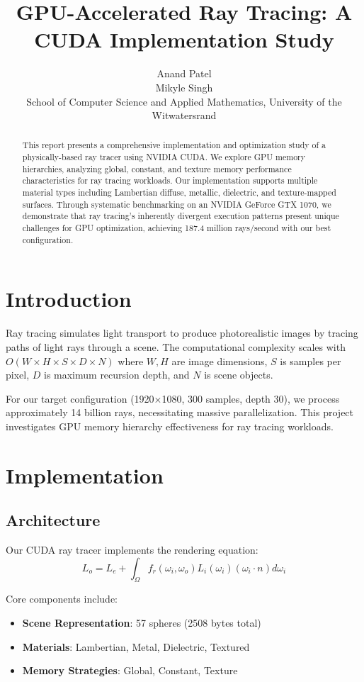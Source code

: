 \documentclass[conference]{IEEEtran}
\title{GPU-Accelerated Ray Tracing: A CUDA Implementation Study}
\author{Anand Patel \\Mikyle Singh \\ School of Computer Science and Applied Mathematics, University of the Witwatersrand}
\begin{document}
\maketitle

\begin{abstract}
This report presents a comprehensive implementation and optimization study of a physically-based ray tracer using NVIDIA CUDA. We explore GPU memory hierarchies, analyzing global, constant, and texture memory performance characteristics for ray tracing workloads. Our implementation supports multiple material types including Lambertian diffuse, metallic, dielectric, and texture-mapped surfaces. Through systematic benchmarking on an NVIDIA GeForce GTX 1070, we demonstrate that ray tracing's inherently divergent execution patterns present unique challenges for GPU optimization, achieving 187.4 million rays/second with our best configuration.
\end{abstract}

\section{Introduction}
Ray tracing simulates light transport to produce photorealistic images by tracing paths of light rays through a scene. The computational complexity scales with $O(W \times H \times S \times D \times N)$ where $W,H$ are image dimensions, $S$ is samples per pixel, $D$ is maximum recursion depth, and $N$ is scene objects.

For our target configuration (1920×1080, 300 samples, depth 30), we process approximately 14 billion rays, necessitating massive parallelization. This project investigates GPU memory hierarchy effectiveness for ray tracing workloads.

\section{Implementation}

\subsection{Architecture}
Our CUDA ray tracer implements the rendering equation:
\begin{equation}
L_o = L_e + \int_{\Omega} f_r(\omega_i, \omega_o) L_i(\omega_i) (\omega_i \cdot n) d\omega_i
\end{equation}

Core components include:
\begin{itemize}
    \item \textbf{Scene Representation}: 57 spheres (2508 bytes total)
    \item \textbf{Materials}: Lambertian, Metal, Dielectric, Textured
    \item \textbf{Memory Strategies}: Global, Constant, Texture
\end{itemize}
\end{document}
